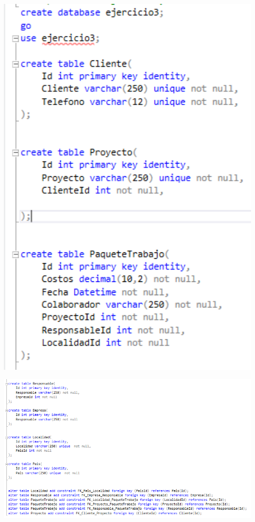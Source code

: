 	\begin{center}
	\includegraphics[width=17cm]{./Imagenes/31}
	\end{center}	

	\begin{center}
	\includegraphics[width=17cm]{./Imagenes/32}
	\end{center}	


